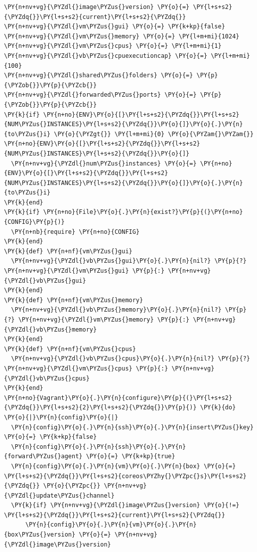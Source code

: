 \begin{codelisting}
\begin{Verbatim}[fontsize=\relsize{-2.5},fontseries=b,commandchars=\\\{\}]
\PY{n+nv+vg}{\PYZdl{}image\PYZus{}version} \PY{o}{=} \PY{l+s+s2}{\PYZdq{}}\PY{l+s+s2}{current}\PY{l+s+s2}{\PYZdq{}}
\PY{n+nv+vg}{\PYZdl{}vm\PYZus{}gui} \PY{o}{=} \PY{k+kp}{false}
\PY{n+nv+vg}{\PYZdl{}vm\PYZus{}memory} \PY{o}{=} \PY{l+m+mi}{1024}
\PY{n+nv+vg}{\PYZdl{}vm\PYZus{}cpus} \PY{o}{=} \PY{l+m+mi}{1}
\PY{n+nv+vg}{\PYZdl{}vb\PYZus{}cpuexecutioncap} \PY{o}{=} \PY{l+m+mi}{100}
\PY{n+nv+vg}{\PYZdl{}shared\PYZus{}folders} \PY{o}{=} \PY{p}{\PYZob{}}\PY{p}{\PYZcb{}}
\PY{n+nv+vg}{\PYZdl{}forwarded\PYZus{}ports} \PY{o}{=} \PY{p}{\PYZob{}}\PY{p}{\PYZcb{}}
\PY{k}{if} \PY{n+no}{ENV}\PY{o}{[}\PY{l+s+s2}{\PYZdq{}}\PY{l+s+s2}{NUM\PYZus{}INSTANCES}\PY{l+s+s2}{\PYZdq{}}\PY{o}{]}\PY{o}{.}\PY{n}{to\PYZus{}i} \PY{o}{\PYZgt{}} \PY{l+m+mi}{0} \PY{o}{\PYZam{}\PYZam{}} \PY{n+no}{ENV}\PY{o}{[}\PY{l+s+s2}{\PYZdq{}}\PY{l+s+s2}{NUM\PYZus{}INSTANCES}\PY{l+s+s2}{\PYZdq{}}\PY{o}{]}
  \PY{n+nv+vg}{\PYZdl{}num\PYZus{}instances} \PY{o}{=} \PY{n+no}{ENV}\PY{o}{[}\PY{l+s+s2}{\PYZdq{}}\PY{l+s+s2}{NUM\PYZus{}INSTANCES}\PY{l+s+s2}{\PYZdq{}}\PY{o}{]}\PY{o}{.}\PY{n}{to\PYZus{}i}
\PY{k}{end}
\PY{k}{if} \PY{n+no}{File}\PY{o}{.}\PY{n}{exist?}\PY{p}{(}\PY{n+no}{CONFIG}\PY{p}{)}
  \PY{n+nb}{require} \PY{n+no}{CONFIG}
\PY{k}{end}
\PY{k}{def} \PY{n+nf}{vm\PYZus{}gui}
  \PY{n+nv+vg}{\PYZdl{}vb\PYZus{}gui}\PY{o}{.}\PY{n}{nil?} \PY{p}{?} \PY{n+nv+vg}{\PYZdl{}vm\PYZus{}gui} \PY{p}{:} \PY{n+nv+vg}{\PYZdl{}vb\PYZus{}gui}
\PY{k}{end}
\PY{k}{def} \PY{n+nf}{vm\PYZus{}memory}
  \PY{n+nv+vg}{\PYZdl{}vb\PYZus{}memory}\PY{o}{.}\PY{n}{nil?} \PY{p}{?} \PY{n+nv+vg}{\PYZdl{}vm\PYZus{}memory} \PY{p}{:} \PY{n+nv+vg}{\PYZdl{}vb\PYZus{}memory}
\PY{k}{end}
\PY{k}{def} \PY{n+nf}{vm\PYZus{}cpus}
  \PY{n+nv+vg}{\PYZdl{}vb\PYZus{}cpus}\PY{o}{.}\PY{n}{nil?} \PY{p}{?} \PY{n+nv+vg}{\PYZdl{}vm\PYZus{}cpus} \PY{p}{:} \PY{n+nv+vg}{\PYZdl{}vb\PYZus{}cpus}
\PY{k}{end}
\PY{n+no}{Vagrant}\PY{o}{.}\PY{n}{configure}\PY{p}{(}\PY{l+s+s2}{\PYZdq{}}\PY{l+s+s2}{2}\PY{l+s+s2}{\PYZdq{}}\PY{p}{)} \PY{k}{do} \PY{o}{|}\PY{n}{config}\PY{o}{|}
  \PY{n}{config}\PY{o}{.}\PY{n}{ssh}\PY{o}{.}\PY{n}{insert\PYZus{}key} \PY{o}{=} \PY{k+kp}{false}
  \PY{n}{config}\PY{o}{.}\PY{n}{ssh}\PY{o}{.}\PY{n}{forward\PYZus{}agent} \PY{o}{=} \PY{k+kp}{true}
  \PY{n}{config}\PY{o}{.}\PY{n}{vm}\PY{o}{.}\PY{n}{box} \PY{o}{=} \PY{l+s+s2}{\PYZdq{}}\PY{l+s+s2}{coreos\PYZhy{}\PYZpc{}s}\PY{l+s+s2}{\PYZdq{}} \PY{o}{\PYZpc{}} \PY{n+nv+vg}{\PYZdl{}update\PYZus{}channel}
  \PY{k}{if} \PY{n+nv+vg}{\PYZdl{}image\PYZus{}version} \PY{o}{!=} \PY{l+s+s2}{\PYZdq{}}\PY{l+s+s2}{current}\PY{l+s+s2}{\PYZdq{}}
      \PY{n}{config}\PY{o}{.}\PY{n}{vm}\PY{o}{.}\PY{n}{box\PYZus{}version} \PY{o}{=} \PY{n+nv+vg}{\PYZdl{}image\PYZus{}version}

\end{Verbatim}
\end{codelisting}
